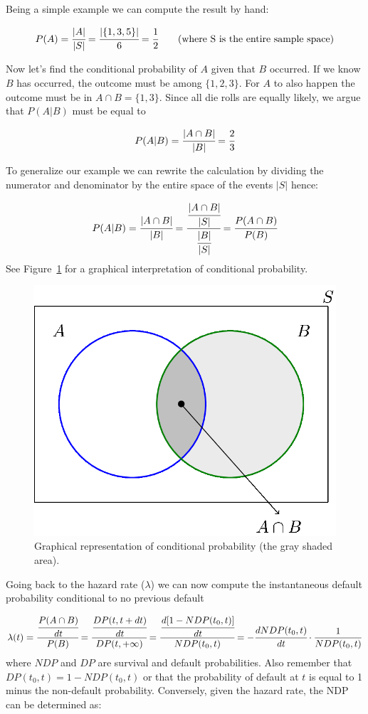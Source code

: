 Being a simple example we can compute the result by hand:

\begin{equation}
P(A) = \cfrac{|A|}{|S|} = \cfrac{|\{1,3,5\}|}{6} = \cfrac{1}{2}\qquad\textrm{(where S is the entire sample space)}
\end{equation}

Now let's find the conditional probability of \(A\) given that \(B\) occurred. If we know \(B\) has occurred, the outcome must be among \(\{1,2,3\}\). For \(A\) to also happen the outcome must be in \(A\cap B = \{1,3\}\). Since all die rolls are equally likely, we argue that \(P(A|B)\) must be equal to

\begin{equation}
P(A|B) = \cfrac{|A\cap B|}{|B|} = \cfrac{2}{3}
\end{equation}

To generalize our example we can rewrite the calculation by dividing the numerator and denominator by the entire space of the events \(|S|\) hence:

\begin{equation}
P(A|B) = \cfrac{|A\cap B|}{|B|} = \cfrac{\cfrac{|A\cap B|}{|S|}}{\cfrac{|B|}{|S|}} = \cfrac{P(A\cap B)}{P(B)}
\end{equation}
See Figure~\ref{fig:conditional_prob} for a graphical interpretation of conditional probability.

\begin{figure}[tb]
\centering
\includegraphics[width=0.5\linewidth]{figures/conditional_b}
\caption{Graphical representation of conditional probability (the gray shaded area).}
\label{fig:conditional_prob}
\end{figure}

Going back to the hazard rate ($\lambda$) we can now compute the instantaneous default probability conditional to no previous default 

\begin{equation}
\lambda(t) = \cfrac{\cfrac{P(A\cap B)}{dt}}{P(B)} = \cfrac{\cfrac{DP(t, t+dt)}{dt}}{DP(t, +\infty)} = \cfrac{\cfrac{d[1-NDP(t_0, t)]}{dt}}{NDP(t_0, t)} = -\cfrac{dNDP(t_0, t)}{dt}\cdot\frac{1}{NDP(t_0, t)}
\end{equation}
where $NDP$ and $DP$ are survival and default probabilities.
Also remember that $DP(t_0, t) = 1 - NDP(t_0, t)$ or that the probability of default at $t$ is equal to 1 minus the non-default probability. Conversely, given the hazard rate, the NDP can be determined as:

